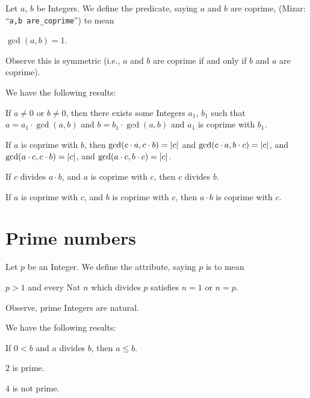 \documentclass{article}
\begin{document}
\begin{definition}%
Let $a$, $b$ be Integers.
We define the predicate, saying $a$ and $b$ are coprime, (Mizar: ``\verb#a,b are_coprime#'')
to mean
\begin{defn}
\item $\gcd(a,b)=1$.
\end{defn}
Observe this is symmetric (i.e., $a$ and $b$ are coprime if and only if
$b$ and $a$ are coprime).
\end{definition}

We have the following results:
\begin{thm}
\item\label{int2:23} If $a\neq0$ or $b\neq0$, then there exists some
  Integers $a_{1}$, $b_{1}$ such that $a=a_{1}\cdot\gcd(a,b)$ and
  $b=b_{1}\cdot\gcd(a,b)$ and $a_{1}$ is coprime with $b_{1}$.
\item\label{int2:24} If $a$ is coprime with $b$, then $\gcd(c\cdot a,c\cdot b)=\lvert c\rvert$
  and $\gcd(c\cdot a,b\cdot c)=\lvert c\rvert$,
  and $\gcd(a\cdot c,c\cdot b)=\lvert c\rvert$,
  and $\gcd(a\cdot c,b\cdot c)=\lvert c\rvert$.
\item\label{int2:25} If $c$ divides $a\cdot b$, and $a$ is coprime with
  $c$,
  then $c$ divides $b$.
\item\label{int2:26} If $a$ is coprime with $c$, and $b$ is coprime with $c$,
  then $a\cdot b$ is coprime with $c$.
\end{thm}

\section{Prime numbers}

\begin{definition}
Let $p$ be an Integer.
We define the attribute, saying $p$ is  to mean
\begin{defn}
\item $p>1$ and every Nat $n$ which divides $p$ satisfies $n=1$ or $n=p$.
\end{defn}
\end{definition}

Observe, prime Integers are natural.

We have the following results:
\begin{thm}
\item\label{int2:27} If $0<b$ and $a$ divides $b$, then $a\leq b$.
\item\label{int2:28} $2$ is prime.
\item\label{int2:29} $4$ is not prime.
\end{thm}
\end{document}
